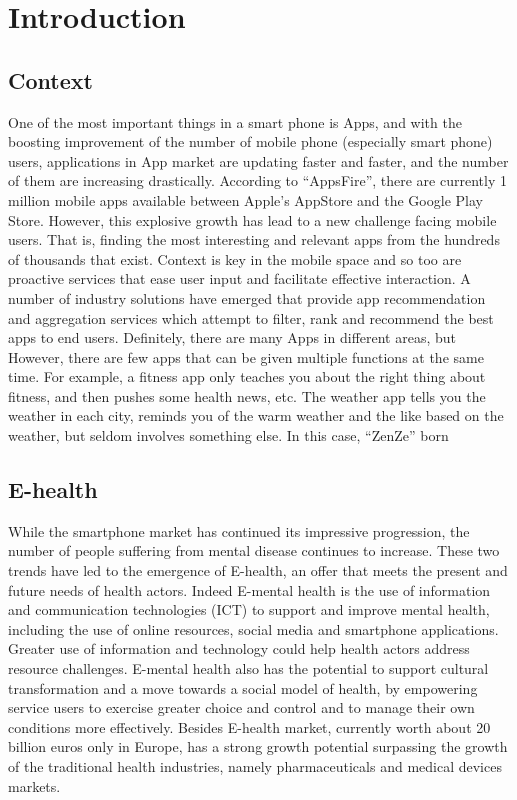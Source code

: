 \documentclass{sigchi}
\def\plainkeywords{Mobile Games; Platformer; Serious Games; Health.}
\begin{document}

\keywords{\plainkeywords}

\medbreak 

\section{Introduction}
\subsection{Context}
One of the most important things in a smart phone is Apps, and with the boosting improvement of the number of mobile phone (especially smart phone) users, applications in App market are updating faster and faster, and the number of them are increasing drastically. According to ``AppsFire'', there are currently 1 million mobile apps available between Apple's AppStore and the Google Play Store. However, this explosive growth has lead to a new challenge facing mobile users. That is, ﬁnding the most interesting and relevant apps from the hundreds of thousands that exist. Context is key in the mobile space and so too are proactive services that ease user input and facilitate effective interaction. A number of industry solutions have emerged that provide app recommendation and aggregation services which attempt to ﬁlter, rank and recommend the best apps to end users.
Definitely, there are many Apps in different areas, but However, there are few apps that can be given multiple functions at the same time. For example, a fitness app only teaches you about the right thing about fitness, and then pushes some health news, etc. The weather app tells you the weather in each city, reminds you of the warm weather and the like based on the weather, but seldom involves something else. In this case, ``ZenZe'' born

\subsection{E-health}
While the smartphone market has continued its impressive progression, the number of people suffering from mental disease continues to increase. These two trends have led to the emergence of E-health, an offer that meets the present and future needs of health actors. Indeed E-mental health is the use of information and communication technologies (ICT) to support and improve mental health, including the use of online resources, social media and smartphone applications. Greater use of information and technology could help health actors address resource challenges. E-mental health also has the potential to support cultural transformation and a move towards a social model of health, by empowering service users to exercise greater choice and control and to manage their own conditions more effectively. Besides E-health market, currently worth about 20 billion euros only in Europe, has a strong growth potential surpassing the growth of the traditional health industries, namely pharmaceuticals and medical devices markets.
\end{document}
